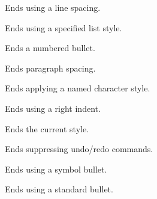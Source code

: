 Ends using a line spacing.

\label{wxrichtextbufferendliststyle}


Ends using a specified list style.

\label{wxrichtextbufferendnumberedbullet}


Ends a numbered bullet.

\label{wxrichtextbufferendparagraphspacing}


Ends paragraph spacing.

\label{wxrichtextbufferendparagraphstyle}


Ends applying a named character style.

\label{wxrichtextbufferendrightindent}


Ends using a right indent.

\label{wxrichtextbufferendstyle}


Ends the current style.

\label{wxrichtextbufferendsuppressundo}


Ends suppressing undo/redo commands.

\label{wxrichtextbufferendsymbolbullet}


Ends using a symbol bullet.

\label{wxrichtextbufferendstandardbullet}


Ends using a standard bullet.

\label{wxrichtextbufferendtextcolour}

